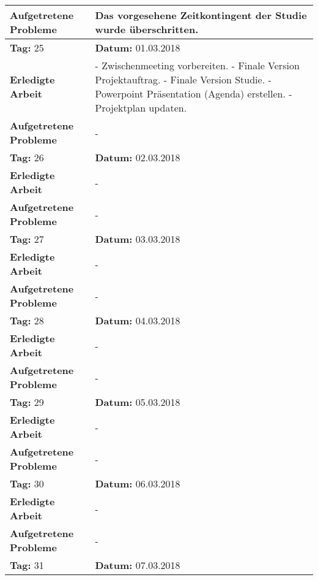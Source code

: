 \begin{longtable}{|p{5cm}|p{5cm}p{6cm}|}
\textbf{Aufgetretene Probleme} & \multicolumn{2}{p{11cm}|}{Das vorgesehene Zeitkontingent der Studie wurde überschritten.} \\ \hline
\rowcolor{heading}\textbf{Tag:} 25 & \textbf{Datum:} 01.03.2018 & \\ \hline
\textbf{Erledigte Arbeit} & \multicolumn{2}{p{11cm}|}{- Zwischenmeeting vorbereiten. \newline
- Finale Version Projektauftrag. \newline
- Finale Version Studie. \newline
- Powerpoint Präsentation (Agenda) erstellen. \newline
- Projektplan updaten. } \\ \hline
\textbf{Aufgetretene Probleme} & \multicolumn{2}{p{11cm}|}{-} \\ \hline
\rowcolor{heading}\textbf{Tag:} 26 & \textbf{Datum:} 02.03.2018 & \\ \hline
\textbf{Erledigte Arbeit} & \multicolumn{2}{p{11cm}|}{-} \\ \hline
\textbf{Aufgetretene Probleme} & \multicolumn{2}{p{11cm}|}{-} \\ \hline
\rowcolor{heading}\textbf{Tag:} 27 & \textbf{Datum:} 03.03.2018 & \\ \hline
\textbf{Erledigte Arbeit} & \multicolumn{2}{p{11cm}|}{-} \\ \hline
\textbf{Aufgetretene Probleme} & \multicolumn{2}{p{11cm}|}{-} \\ \hline
\rowcolor{heading}\textbf{Tag:} 28 & \textbf{Datum:} 04.03.2018 & \\ \hline
\textbf{Erledigte Arbeit} & \multicolumn{2}{p{11cm}|}{-} \\ \hline
\textbf{Aufgetretene Probleme} & \multicolumn{2}{p{11cm}|}{-} \\ \hline
\rowcolor{heading}\textbf{Tag:} 29 & \textbf{Datum:} 05.03.2018 & \\ \hline
\textbf{Erledigte Arbeit} & \multicolumn{2}{p{11cm}|}{-} \\ \hline
\textbf{Aufgetretene Probleme} & \multicolumn{2}{p{11cm}|}{-} \\ \hline
\rowcolor{heading}\textbf{Tag:} 30 & \textbf{Datum:} 06.03.2018 & \\ \hline
\textbf{Erledigte Arbeit} & \multicolumn{2}{p{11cm}|}{-} \\ \hline
\textbf{Aufgetretene Probleme} & \multicolumn{2}{p{11cm}|}{-} \\ \hline
\rowcolor{heading}\textbf{Tag:} 31 & \textbf{Datum:} 07.03.2018 & \\ \hline

\end{longtable}
